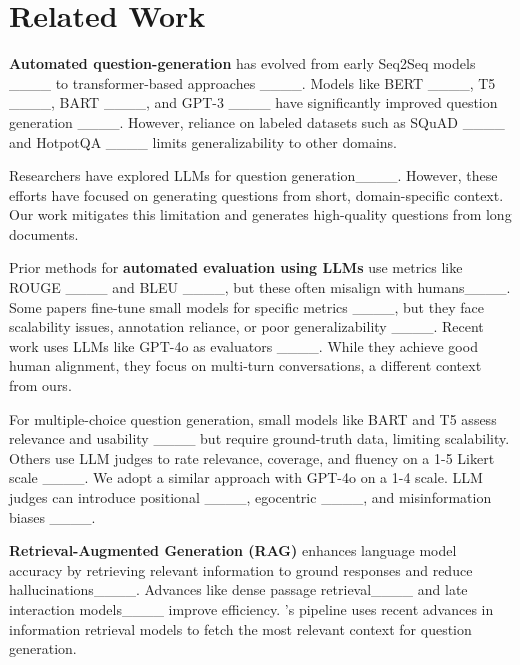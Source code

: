 \section{Related Work}
\label{sec:related-work}

\textbf{Automated question-generation} has evolved from early Seq2Seq models ____ to transformer-based approaches ____. Models like BERT ____, T5 ____, BART ____, and GPT-3 ____ have significantly improved question generation ____. However, reliance on labeled datasets such as SQuAD ____ and HotpotQA ____ limits generalizability to other domains.

Researchers have explored LLMs for question generation____. However, these efforts have focused on generating questions from short, domain-specific context. Our work mitigates this limitation and generates high-quality questions from long documents.


Prior methods for \textbf{automated evaluation using LLMs} use metrics like ROUGE ____ and BLEU ____, but these often misalign with humans____. Some papers fine-tune small models for specific metrics ____, but they face scalability issues, annotation reliance, or poor generalizability ____. Recent work uses  LLMs like GPT-4o as evaluators ____. While they achieve good human alignment, they focus on multi-turn conversations, a different context from ours.

For multiple-choice question generation, small models like BART and T5 assess relevance and usability ____ but require ground-truth data, limiting scalability. Others use LLM judges to rate relevance, coverage, and fluency on a 1-5 Likert scale ____. 
We adopt a similar approach with GPT-4o on a 1-4 scale. 
LLM judges can introduce positional ____, egocentric ____, and misinformation biases ____.


\textbf{Retrieval-Augmented Generation (RAG)} enhances language model accuracy by retrieving relevant information to ground responses and reduce hallucinations____. Advances like dense passage retrieval____ and late interaction models____ improve efficiency. \name's pipeline uses recent advances in information retrieval models to fetch the most relevant context for question generation.